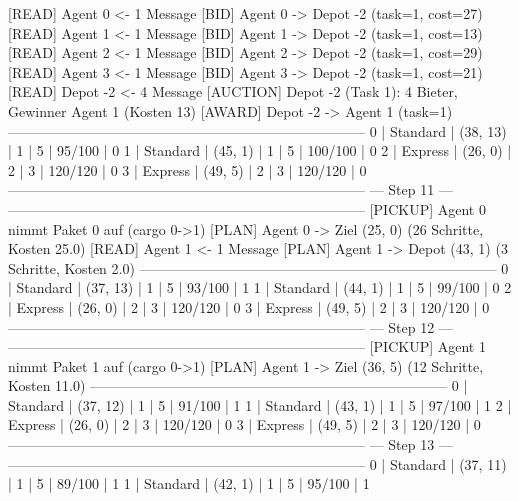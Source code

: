 [READ]    Agent 0 <- 1 Message
[BID]      Agent 0 -> Depot -2 (task=1, cost=27)
[READ]    Agent 1 <- 1 Message
[BID]      Agent 1 -> Depot -2 (task=1, cost=13)
[READ]    Agent 2 <- 1 Message
[BID]      Agent 2 -> Depot -2 (task=1, cost=29)
[READ]    Agent 3 <- 1 Message
[BID]      Agent 3 -> Depot -2 (task=1, cost=21)
[READ]    Depot -2 <- 4 Message
[AUCTION] Depot -2 (Task 1): 4 Bieter, Gewinner Agent 1 (Kosten 13)
[AWARD]    Depot -2 -> Agent 1 (task=1)
-----------------------------------------------------------------------------
 0     | Standard  | (38, 13)    | 1       | 5          | 95/100    | 0
 1     | Standard  | (45, 1)     | 1       | 5          | 100/100   | 0
 2     | Express   | (26, 0)     | 2       | 3          | 120/120   | 0
 3     | Express   | (49, 5)     | 2       | 3          | 120/120   | 0
-----------------------------------------------------------------------------
                               --- Step 11 ---
-----------------------------------------------------------------------------
[PICKUP]  Agent 0 nimmt Paket 0 auf (cargo 0->1)
[PLAN]      Agent 0 -> Ziel (25, 0) (26 Schritte, Kosten 25.0)
[READ]    Agent 1 <- 1 Message
[PLAN]      Agent 1 -> Depot (43, 1) (3 Schritte, Kosten 2.0)
-----------------------------------------------------------------------------
 0     | Standard  | (37, 13)    | 1       | 5          | 93/100    | 1
 1     | Standard  | (44, 1)     | 1       | 5          | 99/100    | 0
 2     | Express   | (26, 0)     | 2       | 3          | 120/120   | 0
 3     | Express   | (49, 5)     | 2       | 3          | 120/120   | 0
-----------------------------------------------------------------------------
                               --- Step 12 ---
-----------------------------------------------------------------------------
[PICKUP]  Agent 1 nimmt Paket 1 auf (cargo 0->1)
[PLAN]      Agent 1 -> Ziel (36, 5) (12 Schritte, Kosten 11.0)
-----------------------------------------------------------------------------
 0     | Standard  | (37, 12)    | 1       | 5          | 91/100    | 1
 1     | Standard  | (43, 1)     | 1       | 5          | 97/100    | 1
 2     | Express   | (26, 0)     | 2       | 3          | 120/120   | 0
 3     | Express   | (49, 5)     | 2       | 3          | 120/120   | 0
-----------------------------------------------------------------------------
                               --- Step 13 ---
-----------------------------------------------------------------------------
 0     | Standard  | (37, 11)    | 1       | 5          | 89/100    | 1
 1     | Standard  | (42, 1)     | 1       | 5          | 95/100    | 1
